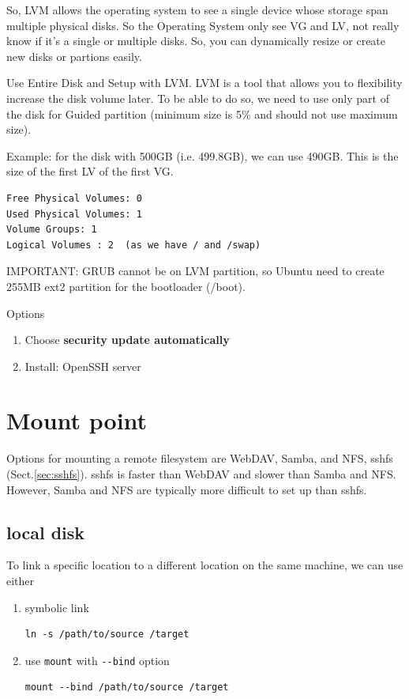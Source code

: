 So, LVM allows the operating system to see a single device whose storage span
multiple physical disks. So the Operating System only see VG and LV, not really
know if it's a single or multiple disks. So, you can dynamically resize or
create new disks or partions easily.

Use Entire Disk and Setup with LVM. LVM is a tool that allows you to flexibility
increase the disk volume later. To be able to do so, we need to use only part of
the disk for Guided partition (minimum size is 5\% and should not use maximum
size). 

Example: for the disk with 500GB (i.e. 499.8GB), we can use 490GB. This is the
size of the first LV of the first VG.
\begin{verbatim}
Free Physical Volumes: 0
Used Physical Volumes: 1
Volume Groups: 1
Logical Volumes : 2  (as we have / and /swap)
\end{verbatim}
IMPORTANT: GRUB cannot be on LVM partition, so Ubuntu need to create 
255MB ext2 partition for the bootloader (/boot).

Options
\begin{enumerate}
  \item Choose {\bf security update automatically}
  \item Install: OpenSSH server
\end{enumerate}




\section{Mount point}
\label{sec:mounting-remote-filesystem}

Options for mounting a remote filesystem are WebDAV, Samba, and NFS, sshfs
(Sect.\ref{sec:sshfs}). sshfs is faster than WebDAV and slower than Samba and
NFS. However, Samba and NFS are typically more difficult to set up than sshfs.

\subsection{local disk}

To link a specific location to a different location on the same machine, we can
use either
\begin{enumerate}
  \item symbolic link
  
\begin{verbatim}
ln -s /path/to/source /target
\end{verbatim}  
  \item use \verb!mount! with \verb!--bind! option
  
\begin{verbatim}
mount --bind /path/to/source /target
\end{verbatim}
\end{enumerate}

